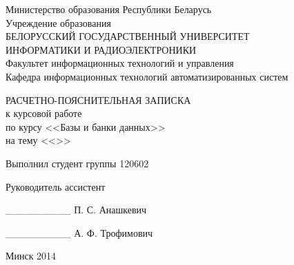 \setlength{\parindent}{0ex} %


\begin{center}
  Министерство образования Республики Беларусь \\
  \smallskip
  Учреждение образования \\
  БЕЛОРУССКИЙ ГОСУДАРСТВЕННЫЙ УНИВЕРСИТЕТ \\
  ИНФОРМАТИКИ И РАДИОЭЛЕКТРОНИКИ \\
  \smallskip
  Факультет информационных технологий и управления \\
  \smallskip
  Кафедра информационных технологий автоматизированных систем
\end{center}

\vspace{60mm}

\begin{center}
  РАСЧЕТНО-ПОЯСНИТЕЛЬНАЯ ЗАПИСКА \\
  к курсовой работе \\
  по курсу <<Базы и банки данных>> \\
  на тему <<>> \\
\end{center}

\vspace{30mm}

\begin{minipage}{.55\linewidth}
    Выполнил студент группы 120602 

    \smallskip

    Руководитель ассистент
\end{minipage}
\hfill
\begin{minipage}{.4\linewidth}
  \begin{flushright}
    \_\_\_\_\_\_\_\_\_ \hspace{1.7mm} П. С. Анашкевич

    \smallskip

    \_\_\_\_\_\_\_\_\_ А. Ф. Трофимович
  \end{flushright}
\end{minipage}

\vspace{70mm}
\begin{center}
  Минск 2014
\end{center}

\setlength{\parindent}{5ex} %